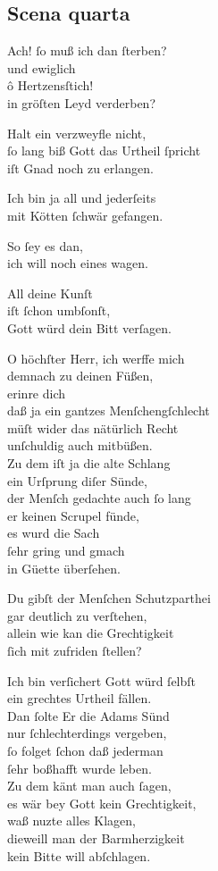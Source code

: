 \documentclass{ees}
\newenvironment{lyrics}[1]{%
  \subsection{#1}\nopagebreak%
  \begin{lyricslist}%
  \let\voice\item%
}{%
  \end{lyricslist}%
}
\begin{document}
\begin{lyrics}{Scena quarta}
  \voice[Adam]
  Ach! ſo muß ich dan ſterben?\\
  und ewiglich\\
  ô Hertzensſtich!\\
  in gröſten Leyd verderben?

  \voice[Barmh.]
  Halt ein verzweyfle nicht,\\
  ſo lang biß Gott das Urtheil ſpricht\\
  iſt Gnad noch zu erlangen.

  \voice[Adam]
  Ich bin ja all und jederſeits\\
  mit Kötten ſchwär gefangen.

  \voice[Barmh.]
  So ſey es dan,\\
  ich will noch eines wagen.

  \voice[Gerecht.]
  All deine Kunſt\\
  iſt ſchon umbſonſt,\\
  Gott würd dein Bitt verſagen.

  \voice[Barmh.]
  O höchſter Herr, ich werffe mich\\
  demnach zu deinen Füßen,\\
  erinre dich\\
  daß ja ein gantzes Menſchengſchlecht\\
  müſt wider das nätürlich Recht\\
  unſchuldig auch mitbüßen.\\
  Zu dem iſt ja die alte Schlang\\
  ein Urſprung diſer Sünde,\\
  der Menſch gedachte auch ſo lang\\
  er keinen Scrupel fünde,\\
  es wurd die Sach\\
  ſehr gring und gmach\\
  in Güette überſehen.
  \clearpage
  \voice[Schöpffer]
  Du gibſt der Menſchen Schutzparthei\\
  gar deutlich zu verſtehen,\\
  allein wie kan die Grechtigkeit\\
  ſich mit zufriden ſtellen?

  \voice[Gerecht.]
  Ich bin verſichert Gott würd ſelbſt\\
  ein grechtes Urtheil fällen.\\
  Dan ſolte Er die Adams Sünd\\
  nur ſchlechterdings vergeben,\\
  ſo folget ſchon daß jederman\\
  ſehr boßhafft wurde leben.\\
  Zu dem känt man auch ſagen,\\
  es wär bey Gott kein Grechtigkeit,\\
  waß nuzte alles Klagen,\\
  dieweill man der Barmherzigkeit\\
  kein Bitte will abſchlagen.


\end{lyrics}
\end{document}
